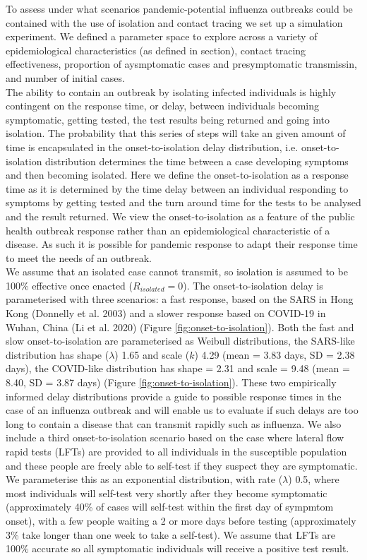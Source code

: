 \documentclass{article}
\begin{document}
To assess under what scenarios pandemic-potential influenza outbreaks could be contained with the use of isolation and contact tracing we set up a simulation experiment. We defined a parameter space to explore across a variety of epidemiological characteristics (as defined in  section), contact tracing effectiveness, proportion of aysmptomatic cases and presymptomatic transmissin, and number of initial cases. \\

The ability to contain an outbreak by isolating infected individuals is highly contingent on the response time, or delay, between individuals becoming symptomatic, getting tested, the test results being returned and going into isolation. The probability that this series of steps will take an given amount of time is encapsulated in the onset-to-isolation delay distribution, i.e. onset-to-isolation distribution determines the time between a case developing symptoms and then becoming isolated. Here we define the onset-to-isolation as a response time as it is determined by the time delay between an individual responding to symptoms by getting tested and the turn around time for the tests to be analysed and the result returned. We view the onset-to-isolation as a feature of the public health outbreak response rather than an epidemiological characteristic of a disease. As such it is possible for pandemic response to adapt their response time to meet the needs of an outbreak. \\

We assume that an isolated case cannot transmit, so isolation is assumed to be 100\% effective once enacted ($R_{isolated} = 0$). The onset-to-isolation delay is parameterised with three scenarios: a fast response, based on the SARS in Hong Kong (Donnelly et al. 2003) and a slower response based on COVID-19 in Wuhan, China (Li et al. 2020) (Figure \ref{fig:onset-to-isolation}). Both the fast and slow onset-to-isolation are parameterised as Weibull distributions, the SARS-like distribution has shape ($\lambda$) 1.65 and scale ($k$) 4.29 (mean = 3.83 days, SD = 2.38 days), the COVID-like distribution has shape = 2.31 and scale = 9.48 (mean = 8.40, SD = 3.87 days) (Figure \ref{fig:onset-to-isolation}). These two empirically informed delay distributions provide a guide to possible response times in the case of an influenza outbreak and will enable us to evaluate if such delays are too long to contain a disease that can transmit rapidly such as influenza. We also include a third onset-to-isolation scenario based on the case where lateral flow rapid tests (LFTs) are provided to all individuals in the susceptible population and these people are freely able to self-test if they suspect they are symptomatic. We parameterise this as an exponential distribution, with rate ($\lambda$) 0.5, where most individuals will self-test very shortly after they become symptomatic (approximately 40\% of cases will self-test within the first day of sympmtom onset), with a few people waiting a 2 or more days before testing (approximately 3\% take longer than one week to take a self-test). We assume that LFTs are 100\% accurate so all symptomatic individuals will receive a positive test result. \\
\end{document}
